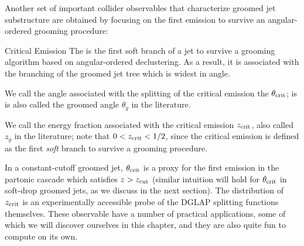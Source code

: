 Another set of important collider observables that characterize groomed jet substructure are obtained by focusing on the first emission to survive an angular-ordered grooming procedure:

\begin{definitionbox}{Critical Emission}{}
    The  is the first soft branch of a jet to survive a grooming algorithm based on angular-ordered \gls{declustering}.
    As a result, it is associated with the branching of the groomed jet tree which is widest in angle.

    We call the angle associated with the splitting of the critical emission the  \(\theta_{\rm crit}\);
    is is also called the groomed angle \(\theta_g\) in the literature.

    We call the energy fraction associated with the critical emission \(z_{\rm crit}\), also called \(z_g\) in the literature;
    note that \(0 < z_{\rm crit} < 1/2\), since the critical emission is defined as the first \textit{soft} branch to survive a grooming procedure.
\end{definitionbox}


In a constant-cutoff groomed jet, \(\theta_{\rm crit}\) is a proxy for the first emission in the partonic cascade which satisfies \(z > z_{\rm cut}\) (similar intuition will hold for \(\theta_{\rm crit}\) in \gls{soft-drop} groomed jets, as we discuss in the next section).
%
The distribution of \(z_{\rm crit}\) is an experimentally accessible probe of the DGLAP splitting functions themselves.\cite{}
%
These observable have a number of practical applications, some of which we will discover ourselves in this chapter, and they are also quite fun to compute on its own.

